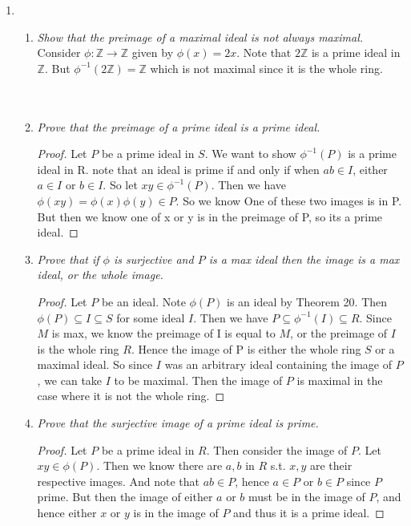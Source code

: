 \documentclass[10pt,oneside,reqno]{amsart}
\theoremstyle{plain}
\theoremstyle{definition}
\newcommand{\sub}{\subseteq}
\newcommand{\z}{\mathbb{Z}}
\begin{document}
\begin{enumerate}
\item []
\begin{enumerate}
\item \textit{Show that the preimage of a maximal ideal is not always maximal. }
Consider $\phi: \z \to \z$ given by $\phi(x)  =2x$. Note that $2\z$ is a prime ideal in $\z$. But $\phi^{-1}(2\z) = \z$ which is not maximal since it is the whole ring. \\\\\\
\item \textit{Prove that the preimage of a prime ideal is a prime ideal. }
\begin{proof}
Let $P$ be a prime ideal in $S$. We want to show $\phi^{-1}(P)$ is a prime ideal in R. note that an ideal is prime if and only if when $ab \in I$, either $a \in I$ or $b \in I$. So let $xy \in \phi^{-1}(P)$. Then we have $\phi(xy) = \phi(x)\phi(y) \in P$. So we know One of these two images is in P. But then we know one of x or y is in the preimage of P, so its a prime ideal. 
\end{proof}

\item \textit{Prove that if $\phi$ is surjective and $P$ is a max ideal then the image is a max ideal, or the whole image.  }

\begin{proof}
Let $P$ be an ideal. Note $\phi(P)$ is an ideal by Theorem 20. Then $\phi(P) \sub I \sub S$ for some ideal $I$. Then we have $P \sub \phi^{-1}(I) \sub R$. Since $M$ is max, we know the preimage of I is equal to $M$, or the preimage of $I$ is the whole ring $R$. Hence the image of P is either the whole ring $S$ or a maximal ideal. So since $I$ was an arbitrary ideal containing the image of $P$, we can take $I$ to be maximal. Then the image of $P$ is maximal in the case where it is not the whole ring. 
\end{proof}

\item \textit{Prove that the surjective image of a prime ideal is prime. }

\begin{proof}
Let $P$ be a prime ideal in $R$. Then consider the image of $P$. Let $xy \in \phi(P)$. Then we know there are $a,b$ in $R$ s.t. $x,y$ are their respective images. And note that $ab \in P$, hence $a \in P$ or $b \in P$ since $P$ prime. But then the image of either $a$ or $b$ must be in the image of $P$, and hence either $x$ or $y$ is in the image of $P$ and thus it is a prime ideal. 
\end{proof}
\end{enumerate}
\end{enumerate}
\end{document}

